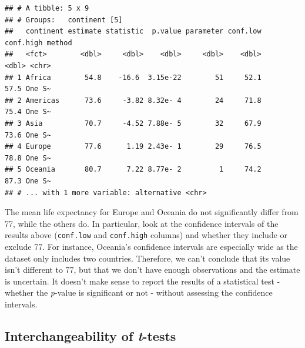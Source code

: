 \documentclass[
  12pt,
  krantz2]{krantz}
\makeatletter
\newenvironment{Shaded}{\begin{snugshade}}{\end{snugshade}}
\newcommand{\CommentTok}[1]{\textcolor[rgb]{0.56,0.35,0.01}{\textit{#1}}}
\newcommand{\DataTypeTok}[1]{\textcolor[rgb]{0.13,0.29,0.53}{#1}}
\newcommand{\DecValTok}[1]{\textcolor[rgb]{0.00,0.00,0.81}{#1}}
\newcommand{\KeywordTok}[1]{\textcolor[rgb]{0.13,0.29,0.53}{\textbf{#1}}}
\newcommand{\NormalTok}[1]{#1}
\newcommand{\OperatorTok}[1]{\textcolor[rgb]{0.81,0.36,0.00}{\textbf{#1}}}
\newcommand{\StringTok}[1]{\textcolor[rgb]{0.31,0.60,0.02}{#1}}
\newenvironment{kframe}{%
\medskip{}
\setlength{\fboxsep}{.8em}
 \def\at@end@of@kframe{}%
 \ifinner\ifhmode%
  \def\at@end@of@kframe{\end{minipage}}%
  \begin{minipage}{\columnwidth}%
 \fi\fi%
 \def\FrameCommand##1{\hskip\@totalleftmargin \hskip-\fboxsep
 \colorbox{shadecolor}{##1}\hskip-\fboxsep
     \hskip-\linewidth \hskip-\@totalleftmargin \hskip\columnwidth}%
 \MakeFramed {\advance\hsize-\width
   \@totalleftmargin\z@ \linewidth\hsize
   \@setminipage}}%
 {\par\unskip\endMakeFramed%
 \at@end@of@kframe}
\renewenvironment{Shaded}{\begin{kframe}}{\end{kframe}}
\makeatother
\begin{document}
\begin{Shaded}
\end{Shaded}

\begin{verbatim}
## # A tibble: 5 x 9
## # Groups:   continent [5]
##   continent estimate statistic  p.value parameter conf.low conf.high method
##   <fct>        <dbl>     <dbl>    <dbl>     <dbl>    <dbl>     <dbl> <chr> 
## 1 Africa        54.8    -16.6  3.15e-22        51     52.1      57.5 One S~
## 2 Americas      73.6     -3.82 8.32e- 4        24     71.8      75.4 One S~
## 3 Asia          70.7     -4.52 7.88e- 5        32     67.9      73.6 One S~
## 4 Europe        77.6      1.19 2.43e- 1        29     76.5      78.8 One S~
## 5 Oceania       80.7      7.22 8.77e- 2         1     74.2      87.3 One S~
## # ... with 1 more variable: alternative <chr>
\end{verbatim}

The mean life expectancy for Europe and Oceania do not significantly differ from 77, while the others do.
In particular, look at the confidence intervals of the results above (\texttt{conf.low} and \texttt{conf.high} columns) and whether they include or exclude 77.
For instance, Oceania's confidence intervals are especially wide as the dataset only includes two countries.
Therefore, we can't conclude that its value isn't different to 77, but that we don't have enough observations and the estimate is uncertain.
It doesn't make sense to report the results of a statistical test - whether the \emph{p}-value is significant or not - without assessing the confidence intervals.

\hypertarget{interchangeability-of-t-tests}{%
\subsection{\texorpdfstring{Interchangeability of \emph{t}-tests}{Interchangeability of t-tests}}\label{interchangeability-of-t-tests}}
\end{document}

